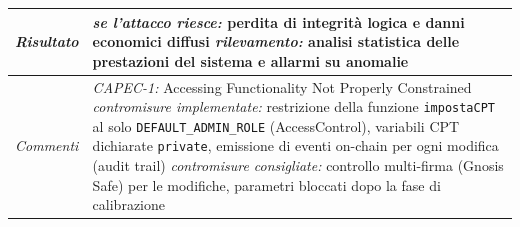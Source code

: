 \begin{longtable}{| >{\columncolor{abuseCol}}p{} | p{} |}
\hline
\textit{Risultato} & \textit{se l'attacco riesce:} perdita di integrità logica e danni economici diffusi \newline \textit{rilevamento:} analisi statistica delle prestazioni del sistema e allarmi su anomalie \\
\hline
\textit{Commenti} & \textit{CAPEC-1:} Accessing Functionality Not Properly Constrained \newline \textit{contromisure implementate:} restrizione della funzione \texttt{impostaCPT} al solo \texttt{DEFAULT\_ADMIN\_ROLE} (AccessControl), variabili CPT dichiarate \texttt{private}, emissione di eventi on-chain per ogni modifica (audit trail) \newline \textit{contromisure consigliate:} controllo multi-firma (Gnosis Safe) per le modifiche, parametri bloccati dopo la fase di calibrazione \\
\hline
\end{longtable}

